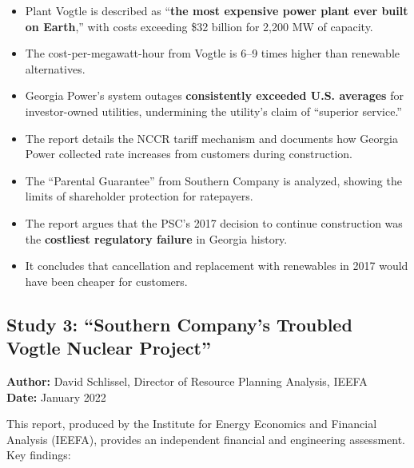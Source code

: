 \documentclass[12pt,a4paper]{article}
\begin{document}
\begin{itemize}
    \item Plant Vogtle is described as ``\textbf{the most expensive power plant ever
          built on Earth},'' with costs exceeding \$32 billion for 2,200 MW of capacity.
    \item The cost-per-megawatt-hour from Vogtle is 6--9 times higher than
          renewable alternatives.
    \item Georgia Power's system outages \textbf{consistently exceeded U.S. averages}
          for investor-owned utilities, undermining the utility's claim of ``superior service.''
    \item The report details the NCCR tariff mechanism and documents how Georgia
          Power collected rate increases from customers during construction.
    \item The ``Parental Guarantee'' from Southern Company is analyzed, showing
          the limits of shareholder protection for ratepayers.
    \item The report argues that the PSC's 2017 decision to continue construction
          was the \textbf{costliest regulatory failure} in Georgia history.
    \item It concludes that cancellation and replacement with renewables in 2017
          would have been cheaper for customers.
\end{itemize}

\subsection{Study 3: ``Southern Company's Troubled Vogtle Nuclear Project''}

\textbf{Author:} David Schlissel, Director of Resource Planning Analysis, IEEFA\\
\textbf{Date:} January 2022

This report, produced by the Institute for Energy Economics and Financial Analysis
(IEEFA), provides an independent financial and engineering assessment. Key findings:
\end{document}
